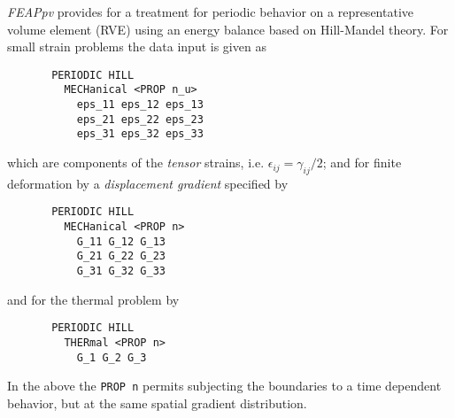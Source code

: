 \textsl{FEAPpv} provides for a treatment for periodic behavior on
a representative volume element (RVE) using an energy balance based on
Hill-Mandel theory.
For small strain problems the data input is given as
\begin{verbatim}
       PERIODIC HILL
         MECHanical <PROP n_u>
           eps_11 eps_12 eps_13
           eps_21 eps_22 eps_23
           eps_31 eps_32 eps_33
\end{verbatim}
which are components of the \textit{tensor} strains, i.e. $\epsilon_{ij} = 
\gamma_{ij}/2$;
and for finite deformation by
a \textit{displacement gradient} specified by
\begin{verbatim}
       PERIODIC HILL
         MECHanical <PROP n>
           G_11 G_12 G_13
           G_21 G_22 G_23
           G_31 G_32 G_33
\end{verbatim}
and for the thermal problem by
\begin{verbatim}
       PERIODIC HILL
         THERmal <PROP n>
           G_1 G_2 G_3
\end{verbatim}
In the above the \texttt{PROP n} permits subjecting the boundaries
to a time dependent behavior, but at the same spatial gradient distribution.
